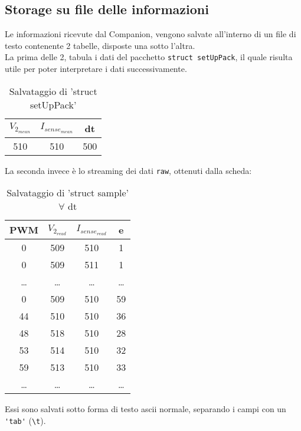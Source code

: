 \subsection{Storage su file delle informazioni}\label{subsec:experimentStorage}
Le informazioni ricevute dal Companion, vengono salvate all'interno di un file di testo contenente 2 tabelle, disposte una sotto l'altra.\\
La prima delle 2, tabula i dati del pacchetto \verb|struct setUpPack|, il quale risulta utile per poter interpretare i dati successivamente.
\begin{table}[H]
	\centering
	\caption[Salvataggio di 'struct setUpPack']{Salvataggio di 'struct setUpPack'}
	\begin{tabular}[t]{|c|c|c|}
		\hline
		$ V_{2_{mean}} $ & $ I_{sense_{mean}}$ & dt  \\
		\hline
		510              & 510                 & 500 \\
		\hline
	\end{tabular}
\end{table}

\noindent
La seconda invece è lo streaming dei dati \verb|raw|, ottenuti dalla scheda:
\begin{table}[H]
	\centering
	\caption[Salvataggio di 'struct sample' $\forall$ dt]{Salvataggio di 'struct sample' $\forall$ dt}
	\begin{tabular}[t]{|c|c|c|c|}
		\hline
		PWM   & $ V_{2_{read}}$ & $ I_{sense_{read}}$ & e     \\
		\hline
		0     & 509             & 510                 & 1     \\
		0     & 509             & 511                 & 1     \\
		\dots & \dots           & \dots               & \dots \\
		0     & 509             & 510                 & 59    \\
		44    & 510             & 510                 & 36    \\
		48    & 518             & 510                 & 28    \\
		53    & 514             & 510                 & 32    \\
		59    & 513             & 510                 & 33    \\
		\dots & \dots           & \dots               & \dots \\
		\hline
	\end{tabular}

\end{table}
\noindent
Essi sono salvati sotto forma di testo ascii normale, separando i campi con un \verb|'tab'| (\verb|\t|).

